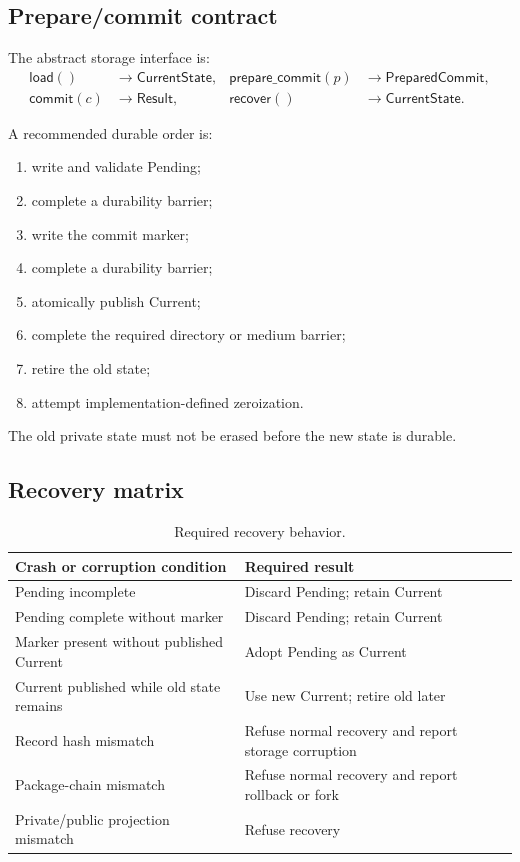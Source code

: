 \documentclass[11pt,letterpaper]{article}
\begin{document}
\subsection{Prepare/commit contract}

The abstract storage interface is:
\[
  \begin{aligned}
    \mathsf{load}() &\rightarrow \mathsf{CurrentState}, &
    \mathsf{prepare\_commit}(p) &\rightarrow \mathsf{PreparedCommit},\\
    \mathsf{commit}(c) &\rightarrow \mathsf{Result}, &
    \mathsf{recover}() &\rightarrow \mathsf{CurrentState}.
  \end{aligned}
\]

A recommended durable order is:
\begin{enumerate}[leftmargin=*]
  \item write and validate Pending;
  \item complete a durability barrier;
  \item write the commit marker;
  \item complete a durability barrier;
  \item atomically publish Current;
  \item complete the required directory or medium barrier;
  \item retire the old state;
  \item attempt implementation-defined zeroization.
\end{enumerate}
The old private state must not be erased before the new state is durable.

\subsection{Recovery matrix}

\begin{table}[ht]
\centering
\caption{Required recovery behavior.}
\label{tab:recovery}
\begin{tabularx}{\textwidth}{P{0.42\textwidth}Y}
\toprule
Crash or corruption condition & Required result \\
\midrule
Pending incomplete & Discard Pending; retain Current \\
Pending complete without marker & Discard Pending; retain Current \\
Marker present without published Current & Adopt Pending as Current \\
Current published while old state remains & Use new Current; retire old later \\
Record hash mismatch & Refuse normal recovery and report storage corruption \\
Package-chain mismatch & Refuse normal recovery and report rollback or fork \\
Private/public projection mismatch & Refuse recovery \\
\bottomrule
\end{tabularx}
\end{table}
\end{document}
